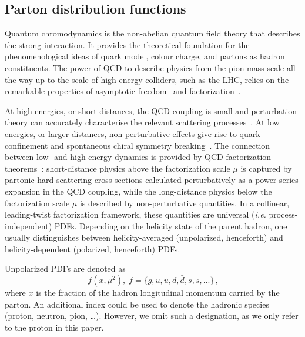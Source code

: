 \subsection{Parton distribution functions}
\label{Sec:IntroPDFs}

Quantum chromodynamics is the non-abelian quantum field 
theory that describes the strong interaction.
%
It provides the theoretical foundation for the phenomenological ideas of 
quark model, colour charge, and partons as hadron constituents.
%
The power of QCD to describe physics from the pion mass scale all the way up 
to the scale of high-energy colliders, such as the LHC, relies on the 
remarkable properties of asymptotic freedom~\cite{Gross:1973ju,Gross:1973id,
Gross:1974cs,Politzer:1974fr} and 
factorization~\cite{Collins:1987pm,Collins:1989gx}.

At high energies, or short distances, the QCD coupling is small 
and perturbation theory can accurately characterise the relevant scattering 
processes~\cite{Campbell:2006wx}.
%
At low energies, or larger distances, non-perturbative effects give rise to 
quark confinement and spontaneous chiral symmetry breaking~\cite{Gasser:1983yg}.
%
The connection between low- and high-energy dynamics is provided by QCD 
factorization theorems~\cite{Collins:1987pm,Collins:1989gx}: 
short-distance physics above the factorization scale $\mu$ is captured by 
partonic hard-scattering cross sections calculated perturbatively as a 
power series expansion in the QCD coupling, while the 
long-distance physics below the factorization scale $\mu$ is described by 
non-perturbative quantities.
%
In a collinear, leading-twist factorization framework, these quantities are
universal ({\it i.e.} process-independent) PDFs.
%
Depending on the helicity state of the parent hadron, one usually 
distinguishes between helicity-averaged (unpolarized, henceforth)
and helicity-dependent (polarized, henceforth) PDFs.

Unpolarized PDFs are denoted as 
\begin{equation}
f(x,\mu^2)\mbox{,} \ \ f=\{g,u,\bar{u},d,\bar{d},s,\bar{s},...\}
\,\mbox{,}
\label{eq:unpPDFs}
\end{equation}
where $x$ is the fraction
of the hadron longitudinal momentum carried by the parton.
%
An additional index could be used to denote the hadronic species (proton,
neutron, pion, \dots).
%
However, we omit such a designation, as we only refer to the proton
in this paper.

